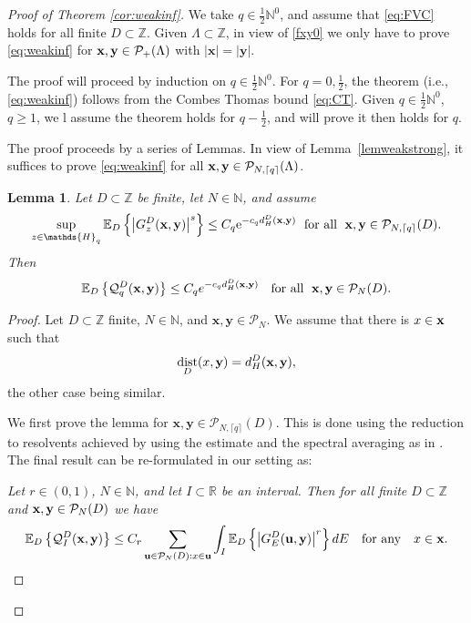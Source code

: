 \documentclass[12pt, a4paper,reqno]{amsart}
\numberwithin{equation}{section}
\newtheorem{lemma}[theorem]{Lemma}
\DeclareMathOperator{\dist}{dist}
\newcommand\R{\mathbb R}
\newcommand\N{\mathbb N}
\newcommand\Z{\mathbb Z}
\newcommand\x{\mathbf{x}}
\newcommand\y{\mathbf{y}}
\newcommand\e{\mathrm{e}}
\newcommand\E{\mathbb E}
\newcommand\cQ{\mathcal{Q}}
\newcommand\cP{\mathcal{P}}
\newcommand\be{\begin{equation}\begin{aligned}}
\newcommand\ee{\end{aligned}\end{equation}}
\newcommand{\abs}[1]{\left\lvert #1 \right\rvert}
\newcommand{\set}[1]{\left\{ #1 \right\}}
\newcommand{\cl}[1]{\lceil #1 \rceil}
\newcommand\La{\Lambda}
\newcommand{\eq}[1]{\eqref{#1}}
\newcommand{\qtx}[1]{\quad\text{#1}\quad}
\newcommand{\mqtx}[1]{\; \ \text{#1}\; \  }
\begin{document}
\begin{proof}[Proof of  Theorem \ref{cor:weakinf}]

  We take  $q\in \frac 12 \N^0$, and assume     that \eq{eq:FVC} holds for  all finite $D\subset \Z$.   Given $\La \subset \Z$,  in view of \eq{fxy0} we only have to prove  \eq{eq:weakinf}   for   ${\bf x},{\bf y}\in \cP_+ (\La)$  with  $\abs{\x}=\abs{\y}$.
  
  The proof will proceed by induction on  $q\in \frac 12 \N^0$.   For $q=0,\frac 12$, the theorem  (i.e.,  \eq{eq:weakinf}) follows from the Combes Thomas bound \eq{eq:CT}.  Given $q\in \frac 12 \N^0$, $q\ge 1$, we l  assume the theorem holds  for  $q-\frac 12$, 
 and will  prove it then holds for $q$.
  
 The proof proceeds by a series of Lemmas. In view of Lemma~\ref{lemweakstrong}, 
 it suffices to prove  \eqref{eq:weakinf}  for all  ${\bf x},{\bf y}\in \cP_{N,\cl{q}}(\La)$.

\begin{lemma}
\label{thm:eigencorweak} 
Let $D\subset \Z$ be finite, let $N\in \N$,  and assume
\be\label{eq:weakinf46} 
 \sup_{z\in\mathds{H}_{ q}}\E_D \set{\abs{G^{D}_{z}({\bf x},{\bf y})}^s}\le  C_q \e^{-c_{q}   d_H^D ({\bf x},{\bf y})} \mqtx{for all}\x,\y\in \cP_{N,\cl{q}}(D).
\ee 
Then      
  \be \label{eq:smva'}
\E_{D}\set{\cQ_q^D ({\bf x},{\bf y})}\le  C_q e^{-c_q d_{H}^D({\bf x},{\bf y})} \ \mqtx{for all}\x,\y\in \cP_{N}(D).
\ee  
 \end{lemma}


\begin{proof}  Let $D\subset \Z$ finite, $N\in \N$, and $\x,\y\in \cP_{N}$.
We  assume that there is $x\in {\bf x}$ such that 
 \be\label{defHD}
  \dist_D (x, {\bf y})= d^D_{H}({\bf x}, {\bf y}),
 \ee 
  the other case being similar. 

 We first prove the lemma for $\x,\y\in \cP_{N,\cl{q}}(D)$.
This is done using the reduction to  resolvents  achieved by using   the estimate \cite[Eq. (7.44)]{AW} and the spectral averaging as in {\cite[Theorem 4.5]{AW2}}.  The final result can be re-formulated in our setting as:  

\emph{Let $r\in(0, 1)$, $N\in \N$, and  let $I\subset \R$ be an interval.   Then for all finite $D \subset \Z$ and 
  ${\bf x},{\bf y}\in \cP_N(D)$  we  have 
 \be\label{eq:eigencorwea} 
\E_{D}\set{\cQ_I^D({\bf x},{\bf y})}\le C_r\sum_{{\bf u}\in \cP_N(D): x\in {\bf u}} \int_I \E_{D}\set{\abs{G_E^D ({\bf u},{\bf y})}^r}dE
 \qtx{for any} x\in {\bf x}. 
 \ee}


\end{proof}
\end{proof}
\end{document}

